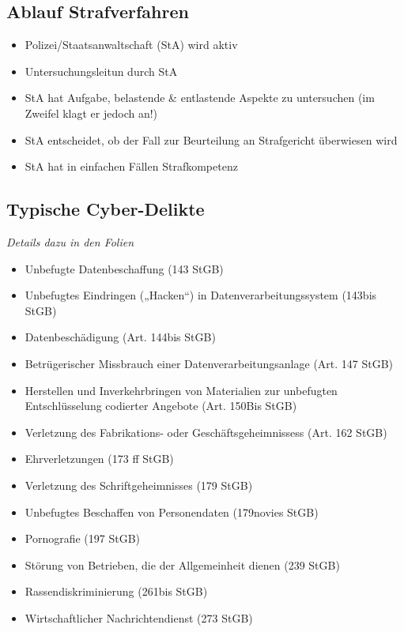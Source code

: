 \hypertarget{ablauf-strafverfahren}{%
\subsection{Ablauf Strafverfahren}\label{ablauf-strafverfahren}}

\begin{itemize}
\tightlist
\item
  Polizei/Staatsanwaltschaft (StA) wird aktiv
\item
  Untersuchungsleitun durch StA
\item
  StA hat Aufgabe, belastende \& entlastende Aspekte zu untersuchen (im
  Zweifel klagt er jedoch an!)
\item
  StA entscheidet, ob der Fall zur Beurteilung an Strafgericht
  überwiesen wird
\item
  StA hat in einfachen Fällen Strafkompetenz
\end{itemize}

\hypertarget{typische-cyber-delikte}{%
\subsection{Typische Cyber-Delikte}\label{typische-cyber-delikte}}

\emph{Details dazu in den Folien}

\begin{itemize}
\tightlist
\item
  Unbefugte Datenbeschaffung (143 StGB)
\item
  Unbefugtes Eindringen („Hacken``) in Datenverarbeitungssystem (143bis
  StGB)
\item
  Datenbeschädigung (Art. 144bis StGB)
\item
  Betrügerischer Missbrauch einer Datenverarbeitungsanlage (Art. 147
  StGB)
\item
  Herstellen und Inverkehrbringen von Materialien zur unbefugten
  Entschlüsselung codierter Angebote (Art. 150Bis StGB)
\item
  Verletzung des Fabrikations- oder Geschäftsgeheimnissess (Art. 162
  StGB)
\item
  Ehrverletzungen (173 ff StGB)
\item
  Verletzung des Schriftgeheimnisses (179 StGB)
\item
  Unbefugtes Beschaffen von Personendaten (179novies StGB)
\item
  Pornografie (197 StGB)
\item
  Störung von Betrieben, die der Allgemeinheit dienen (239 StGB)
\item
  Rassendiskriminierung (261bis StGB)
\item
  Wirtschaftlicher Nachrichtendienst (273 StGB)
\end{itemize}
